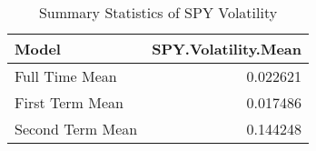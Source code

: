 \begin{table}

\caption{Summary Statistics of SPY Volatility}
\centering
\begin{tabular}[t]{l|r}
\hline
Model & SPY.Volatility.Mean\\
\hline
Full Time Mean & 0.022621\\
\hline
First Term Mean & 0.017486\\
\hline
Second Term Mean & 0.144248\\
\hline
\end{tabular}
\end{table}
